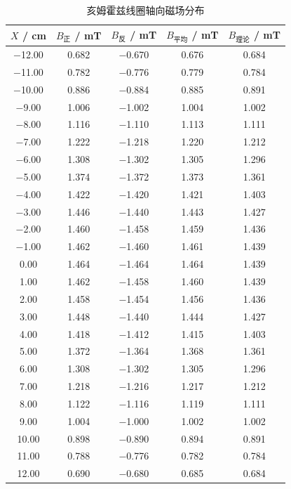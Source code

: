 \documentclass{Phyport}
\begin{document}
\begin{table}[H]
    \centering
    \caption{亥姆霍兹线圈轴向磁场分布}
    \label{tab:helmholtz}
    \small
    \begin{tabular}{ccccc}
        \toprule
        $X$ / cm & $B_{\text{正}}$ / mT & $B_{\text{反}}$ / mT & $B_{\text{平均}}$ / mT & $B_{\text{理论}}$ / mT \\
        \midrule
        $-$12.00 & 0.682 & $-$0.670 & 0.676 & 0.684 \\
        $-$11.00 & 0.782 & $-$0.776 & 0.779 & 0.784 \\
        $-$10.00 & 0.886 & $-$0.884 & 0.885 & 0.891 \\
         $-$9.00 & 1.006 & $-$1.002 & 1.004 & 1.002 \\
         $-$8.00 & 1.116 & $-$1.110 & 1.113 & 1.111 \\
         $-$7.00 & 1.222 & $-$1.218 & 1.220 & 1.212 \\
         $-$6.00 & 1.308 & $-$1.302 & 1.305 & 1.296 \\
         $-$5.00 & 1.374 & $-$1.372 & 1.373 & 1.361 \\
         $-$4.00 & 1.422 & $-$1.420 & 1.421 & 1.403 \\
         $-$3.00 & 1.446 & $-$1.440 & 1.443 & 1.427 \\
         $-$2.00 & 1.460 & $-$1.458 & 1.459 & 1.436 \\
         $-$1.00 & 1.462 & $-$1.460 & 1.461 & 1.439 \\
          0.00   & 1.464 & $-$1.464 & 1.464 & 1.439 \\
          1.00   & 1.462 & $-$1.458 & 1.460 & 1.439 \\
          2.00   & 1.458 & $-$1.454 & 1.456 & 1.436 \\
          3.00   & 1.448 & $-$1.440 & 1.444 & 1.427 \\
          4.00   & 1.418 & $-$1.412 & 1.415 & 1.403 \\
          5.00   & 1.372 & $-$1.364 & 1.368 & 1.361 \\
          6.00   & 1.308 & $-$1.302 & 1.305 & 1.296 \\
          7.00   & 1.218 & $-$1.216 & 1.217 & 1.212 \\
          8.00   & 1.122 & $-$1.116 & 1.119 & 1.111 \\
          9.00   & 1.004 & $-$1.000 & 1.002 & 1.002 \\
         10.00   & 0.898 & $-$0.890 & 0.894 & 0.891 \\
         11.00   & 0.788 & $-$0.776 & 0.782 & 0.784 \\
         12.00   & 0.690 & $-$0.680 & 0.685 & 0.684 \\
        \bottomrule
    \end{tabular}
\end{table}
\end{document}

